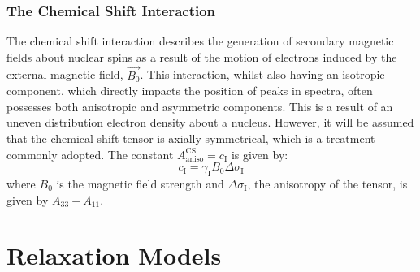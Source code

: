 \subsubsection{The Chemical Shift Interaction}
The chemical shift interaction describes the generation of secondary magnetic fields about nuclear spins as a result of the motion of electrons induced by the external magnetic field, $\vec{B_0}$. This interaction, whilst also having an isotropic component, which directly impacts the position of peaks in spectra, often possesses both anisotropic and asymmetric components. This is a result of an uneven distribution electron density about a nucleus. However, it will be assumed that the chemical shift tensor is axially symmetrical, which is a treatment commonly adopted. The constant $A_{\text{aniso}}^{\text{CS}} = c_{\text{I}}$ is given by:
\begin{equation}
\label{CSAConst}
c_{\text{I}} = \gamma_{\text{I}} B_0 \Delta \sigma_{\text{I}}
\end{equation}
where $B_0$ is the magnetic field strength and $\Delta \sigma_{\text{I}}$, the anisotropy of the tensor, is given by $A_{33} - A_{11}$.
\section{Relaxation Models} \label{RelaxModels}

